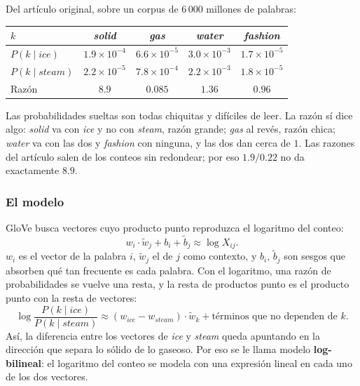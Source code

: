 \documentclass[11pt,letterpaper]{article}
\begin{document}
\begin{ejemplo}
    Del artículo original, sobre un corpus de $6\,000$ millones de
    palabras:
    \begin{center}
    \begin{tabular}{lcccc}
        \toprule
        $k$ & \textit{solid} & \textit{gas} & \textit{water}
            & \textit{fashion} \\
        \midrule
        $P(k \mid \textit{ice})$   & $1.9 \times 10^{-4}$
            & $6.6 \times 10^{-5}$ & $3.0 \times 10^{-3}$
            & $1.7 \times 10^{-5}$ \\
        $P(k \mid \textit{steam})$ & $2.2 \times 10^{-5}$
            & $7.8 \times 10^{-4}$ & $2.2 \times 10^{-3}$
            & $1.8 \times 10^{-5}$ \\
        \midrule
        Razón & $8.9$ & $0.085$ & $1.36$ & $0.96$ \\
        \bottomrule
    \end{tabular}
    \end{center}
    Las probabilidades sueltas son todas chiquitas y difíciles de
    leer. La razón sí dice algo: \textit{solid} va con \textit{ice} y
    no con \textit{steam}, razón grande; \textit{gas} al revés, razón
    chica; \textit{water} va con las dos y \textit{fashion} con
    ninguna, y las dos dan cerca de $1$. Las razones del artículo salen
    de los conteos sin redondear; por eso $1.9 / 0.22$ no da
    exactamente $8.9$.
\end{ejemplo}

\subsubsection*{El modelo}

GloVe busca vectores cuyo producto punto reproduzca el logaritmo del
conteo:
\[
    w_i \cdot \tilde{w}_j + b_i + \tilde{b}_j \approx \log X_{ij} .
\]
$w_i$ es el vector de la palabra $i$, $\tilde{w}_j$ el de $j$ como
contexto, y $b_i$, $\tilde{b}_j$ son sesgos que absorben qué tan
frecuente es cada palabra. Con el logaritmo, una razón de
probabilidades se vuelve una resta, y la resta de productos punto es
el producto punto con la resta de vectores:
\[
    \log \frac{P(k \mid \textit{ice})}{P(k \mid \textit{steam})}
    \approx (w_{\textit{ice}} - w_{\textit{steam}}) \cdot \tilde{w}_k
    + \text{términos que no dependen de } k .
\]
Así, la diferencia entre los vectores de \textit{ice} y
\textit{steam} queda apuntando en la dirección que separa lo sólido de
lo gaseoso. Por eso se le llama modelo \textbf{log-bilineal}: el
logaritmo del conteo se modela con una expresión lineal en cada uno de
los dos vectores.
\end{document}
